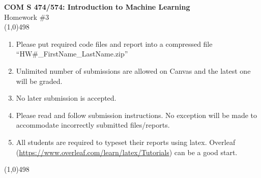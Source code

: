 \documentclass[11pt]{article}
\begin{document}
\begin{center}
{\Large \textbf{COM S 474/574: Introduction to Machine Learning}\\Homework \#3}\\

\linethickness{1mm}\line(1,0){498}

\begin{enumerate}
\item Please put required code files and report into a
compressed file ``HW\#\_FirstName\_LastName.zip''
\item Unlimited number of submissions are
allowed on Canvas and the latest one will be graded.
\item {\color{red} No later submission is accepted.}
\item Please read and follow submission instructions. No exception
will be made to accommodate incorrectly submitted files/reports.
\item All students are required to typeset their reports using
latex. Overleaf
(\url{https://www.overleaf.com/learn/latex/Tutorials}) can be a
good start.
\end{enumerate}

\linethickness{1mm}\line(1,0){498}

\end{center}


\end{document}
